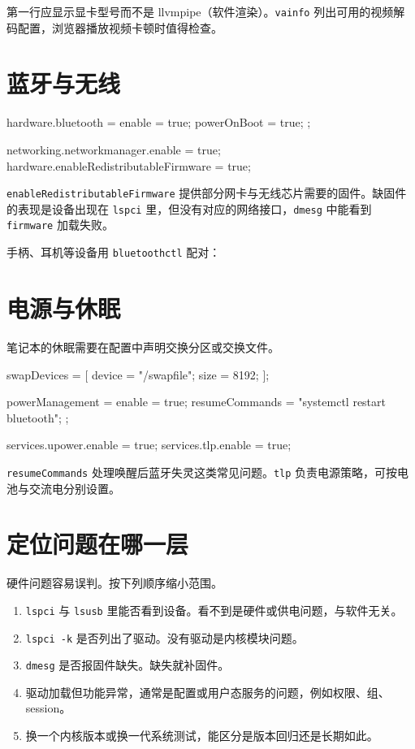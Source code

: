 第一行应显示显卡型号而不是 llvmpipe（软件渲染）。\texttt{vainfo} 列出可用的视频解码配置，浏览器播放视频卡顿时值得检查。

\section{蓝牙与无线}

\begin{nixcode}
hardware.bluetooth = {
  enable = true;
  powerOnBoot = true;
};

networking.networkmanager.enable = true;
hardware.enableRedistributableFirmware = true;
\end{nixcode}

\texttt{enableRedistributableFirmware} 提供部分网卡与无线芯片需要的固件。缺固件的表现是设备出现在 \texttt{lspci} 里，但没有对应的网络接口，\texttt{dmesg} 中能看到 \texttt{firmware} 加载失败。

手柄、耳机等设备用 \texttt{bluetoothctl} 配对：


\section{电源与休眠}

笔记本的休眠需要在配置中声明交换分区或交换文件。

\begin{nixcode}
swapDevices = [
  {
    device = "/swapfile";
    size = 8192;
  }
];

powerManagement = {
  enable = true;
  resumeCommands = "systemctl restart bluetooth";
};

services.upower.enable = true;
services.tlp.enable = true;
\end{nixcode}

\texttt{resumeCommands} 处理唤醒后蓝牙失灵这类常见问题。\texttt{tlp} 负责电源策略，可按电池与交流电分别设置。

\section{定位问题在哪一层}

硬件问题容易误判。按下列顺序缩小范围。

\begin{enumerate}
  \item \texttt{lspci} 与 \texttt{lsusb} 里能否看到设备。看不到是硬件或供电问题，与软件无关。
  \item \texttt{lspci -k} 是否列出了驱动。没有驱动是内核模块问题。
  \item \texttt{dmesg} 是否报固件缺失。缺失就补固件。
  \item 驱动加载但功能异常，通常是配置或用户态服务的问题，例如权限、组、session。
  \item 换一个内核版本或换一代系统测试，能区分是版本回归还是长期如此。
\end{enumerate}

